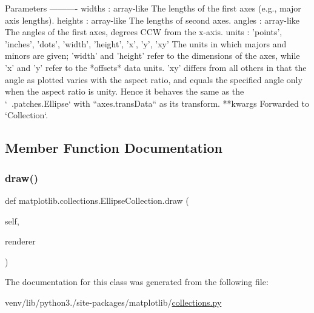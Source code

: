 \begin{DoxyVerb}Parameters
----------
widths : array-like
    The lengths of the first axes (e.g., major axis lengths).
heights : array-like
    The lengths of second axes.
angles : array-like
    The angles of the first axes, degrees CCW from the x-axis.
units : {'points', 'inches', 'dots', 'width', 'height', 'x', 'y', 'xy'}
    The units in which majors and minors are given; 'width' and
    'height' refer to the dimensions of the axes, while 'x' and 'y'
    refer to the *offsets* data units. 'xy' differs from all others in
    that the angle as plotted varies with the aspect ratio, and equals
    the specified angle only when the aspect ratio is unity.  Hence
    it behaves the same as the `~.patches.Ellipse` with
    ``axes.transData`` as its transform.
**kwargs
    Forwarded to `Collection`.
\end{DoxyVerb}
 

\subsection{Member Function Documentation}
\mbox{\label{classmatplotlib_1_1collections_1_1EllipseCollection_a7969dac74439782e2053119819b8914d}} 
\subsubsection{\texorpdfstring{draw()}{draw()}}
{\footnotesize\ttfamily def matplotlib.\+collections.\+Ellipse\+Collection.\+draw (\begin{DoxyParamCaption}\item[{}]{self,  }\item[{}]{renderer }\end{DoxyParamCaption})}



The documentation for this class was generated from the following file\+:\begin{DoxyCompactItemize}
\item 
venv/lib/python3./site-\/packages/matplotlib/\hyperlink{collections_8py}{collections.\+py}\end{DoxyCompactItemize}
